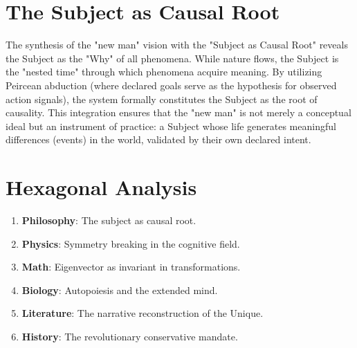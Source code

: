 \documentclass[12pt,a4paper]{report}
\begin{document}
\section{The Subject as Causal Root}
The synthesis of the "new man" vision with the "Subject as Causal Root" reveals the Subject as the "Why" of all phenomena. While nature flows, the Subject is the "nested time" through which phenomena acquire meaning. By utilizing Peircean abduction (where declared goals serve as the hypothesis for observed action signals), the system formally constitutes the Subject as the root of causality. This integration ensures that the "new man" is not merely a conceptual ideal but an instrument of practice: a Subject whose life generates meaningful differences (events) in the world, validated by their own declared intent.

\section{Hexagonal Analysis}
\begin{enumerate}
    \item \textbf{Philosophy}: The subject as causal root.
    \item \textbf{Physics}: Symmetry breaking in the cognitive field.
    \item \textbf{Math}: Eigenvector as invariant in transformations.
    \item \textbf{Biology}: Autopoiesis and the extended mind.
    \item \textbf{Literature}: The narrative reconstruction of the Unique.
    \item \textbf{History}: The revolutionary conservative mandate.
\end{enumerate}

\printbibliography
\end{document}

